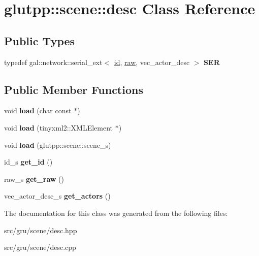 \hypertarget{classglutpp_1_1scene_1_1desc}{\section{glutpp\-:\-:scene\-:\-:desc \-Class \-Reference}
\label{classglutpp_1_1scene_1_1desc}
}
\subsection*{\-Public \-Types}
\begin{DoxyCompactItemize}
\item 
\hypertarget{classglutpp_1_1scene_1_1desc_a8d8a541d801e4ce3530b2b31abe9ac1e}{typedef \*
gal\-::network\-::serial\-\_\-ext$<$ \hyperlink{structglutpp_1_1scene_1_1id}{id}, \*
\hyperlink{classglutpp_1_1scene_1_1raw}{raw}, vec\-\_\-actor\-\_\-desc $>$ {\bfseries \-S\-E\-R}}\label{classglutpp_1_1scene_1_1desc_a8d8a541d801e4ce3530b2b31abe9ac1e}

\end{DoxyCompactItemize}
\subsection*{\-Public \-Member \-Functions}
\begin{DoxyCompactItemize}
\item 
\hypertarget{classglutpp_1_1scene_1_1desc_a7f68fd9fba4752e874f12ed7a4deaeaf}{void {\bfseries load} (char const $\ast$)}\label{classglutpp_1_1scene_1_1desc_a7f68fd9fba4752e874f12ed7a4deaeaf}

\item 
\hypertarget{classglutpp_1_1scene_1_1desc_a9d23db887ca6a6f3a0bd974270c321c5}{void {\bfseries load} (tinyxml2\-::\-X\-M\-L\-Element $\ast$)}\label{classglutpp_1_1scene_1_1desc_a9d23db887ca6a6f3a0bd974270c321c5}

\item 
\hypertarget{classglutpp_1_1scene_1_1desc_a562dde6b9db464940a1f7b19da4f4940}{void {\bfseries load} (glutpp\-::scene\-::scene\-\_\-s)}\label{classglutpp_1_1scene_1_1desc_a562dde6b9db464940a1f7b19da4f4940}

\item 
\hypertarget{classglutpp_1_1scene_1_1desc_a9864bd3d616d3269911354b27759b960}{id\-\_\-s {\bfseries get\-\_\-id} ()}\label{classglutpp_1_1scene_1_1desc_a9864bd3d616d3269911354b27759b960}

\item 
\hypertarget{classglutpp_1_1scene_1_1desc_a0578275e9c59204f7f8b3cd41b62bf4e}{raw\-\_\-s {\bfseries get\-\_\-raw} ()}\label{classglutpp_1_1scene_1_1desc_a0578275e9c59204f7f8b3cd41b62bf4e}

\item 
\hypertarget{classglutpp_1_1scene_1_1desc_a6f4cc7e232ef89bcbff99bcde4ff57cc}{vec\-\_\-actor\-\_\-desc\-\_\-s {\bfseries get\-\_\-actors} ()}\label{classglutpp_1_1scene_1_1desc_a6f4cc7e232ef89bcbff99bcde4ff57cc}

\end{DoxyCompactItemize}


\-The documentation for this class was generated from the following files\-:\begin{DoxyCompactItemize}
\item 
src/gru/scene/desc.\-hpp\item 
src/gru/scene/desc.\-cpp\end{DoxyCompactItemize}
